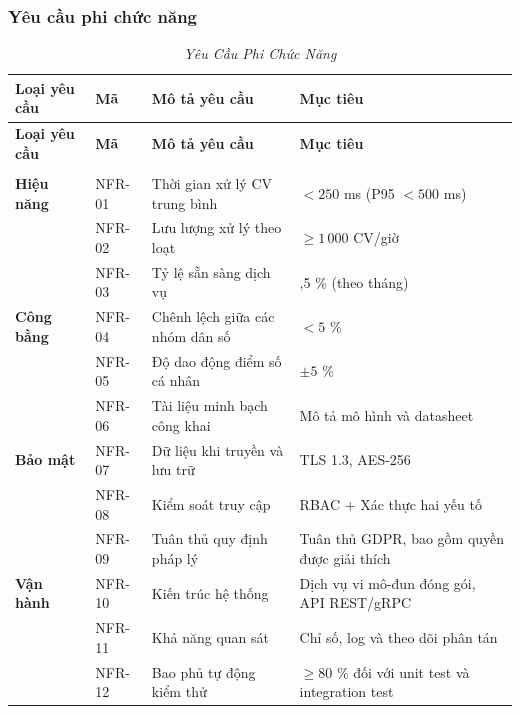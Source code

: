 \documentclass{article}
\begin{document}
\subsubsection{Yêu cầu phi chức năng}
\begin{longtable}{|
  >{\raggedright\arraybackslash}p{}|
  >{\raggedright\arraybackslash}p{}|
  >{\raggedright\arraybackslash}p{}|
  >{\raggedright\arraybackslash}p{}|}
  \hline
  \textbf{Loại yêu cầu} &
  \textbf{Mã} &
  \textbf{Mô tả yêu cầu} &
  \textbf{Mục tiêu} \\
  \hline
  \endfirsthead

  \hline
  \textbf{Loại yêu cầu} &
  \textbf{Mã} &
  \textbf{Mô tả yêu cầu} &
  \textbf{Mục tiêu} \\
  \hline
  \endhead

  \hline
  \endfoot

  \hline
  \caption{\centering\textit{Yêu Cầu Phi Chức Năng}}
  \label{tab:non-functional-requirements} \\
  \endlastfoot

    \textbf{Hiệu năng} & NFR-01 & Thời gian xử lý CV trung bình & $<250$ ms (P95 $<500$ ms) \\ \cline{2-4}
                       & NFR-02 & Lưu lượng xử lý theo loạt & $\ge{}1\,000$ CV/giờ \\ \cline{2-4}
                       & NFR-03 & Tỷ lệ sẵn sàng dịch vụ & 99,5 \% (theo tháng) \\ \hline
    \textbf{Công bằng} & NFR-04 & Chênh lệch giữa các nhóm dân số & $<5$ \% \\ \cline{2-4}
                       & NFR-05 & Độ dao động điểm số cá nhân & $\pm5$ \% \\ \cline{2-4}
                       & NFR-06 & Tài liệu minh bạch công khai & Mô tả mô hình và datasheet \\ \hline
    \textbf{Bảo mật}   & NFR-07 & Dữ liệu khi truyền và lưu trữ & TLS 1.3, AES-256 \\ \cline{2-4}
                       & NFR-08 & Kiểm soát truy cập & RBAC + Xác thực hai yếu tố \\ \cline{2-4}
                       & NFR-09 & Tuân thủ quy định pháp lý & Tuân thủ GDPR, bao gồm quyền được giải thích \\ \hline
    \textbf{Vận hành}  & NFR-10 & Kiến trúc hệ thống & Dịch vụ vi mô-đun đóng gói, API REST/gRPC \\ \cline{2-4}
                       & NFR-11 & Khả năng quan sát & Chỉ số, log và theo dõi phân tán \\ \cline{2-4}
                       & NFR-12 & Bao phủ tự động kiểm thử & $\ge{}80$ \% đối với unit test và integration test \\

\end{longtable}
\end{document}
